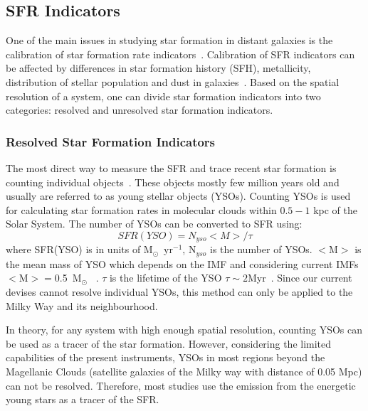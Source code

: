 \subsection{SFR Indicators}

One of the main issues in studying star formation in distant galaxies is the calibration of star formation rate indicators~\citep[e.g.,][]{Lee10}. 
Calibration of SFR indicators can be affected by differences in star formation history (SFH), metallicity, distribution of stellar population and dust in galaxies~\citep{Calzetti13}. 
Based on the spatial resolution of a system, one can divide star formation indicators into two categories: resolved and unresolved star formation indicators.

\subsubsection{Resolved Star Formation Indicators}
The most direct way to measure the SFR and trace recent star formation is counting individual objects~\citep{Kennicutt12}. 
These objects mostly few million years old and usually are referred to as young stellar objects (YSOs). 
Counting YSOs is used for calculating star formation rates in molecular clouds within $0.5- 1$ kpc of the Solar System. 
The number of YSOs can be converted to SFR using: 
\begin{equation}
SFR(YSO) = N_{yso} <M>/\tau 
\end{equation}
where SFR(YSO) is in units of M$_{\odot}$~yr$^{-1}$, N$_{yso}$ is the number of YSOs.
$<$M$>$ is the mean mass of YSO which depends on the IMF and considering current IMFs $<$M$> = $0.5~M$_{\odot}$ ~\citep[][]{Kennicutt12}. 
$\tau$ is the lifetime of the YSO  $\tau \sim 2$Myr~\citep{Evans09}. 
Since our current devises cannot resolve individual YSOs, this method can only be applied to the Milky Way and its neighbourhood. 

In theory, for any system with high enough spatial resolution, counting YSOs can be used as a tracer of the star formation. 
However, considering the limited capabilities of the present instruments, YSOs in most regions beyond the Magellanic Clouds (satellite galaxies of the Milky way with distance of 0.05 Mpc) can not be resolved. 
Therefore, most studies use the emission from the energetic young stars as a tracer of the SFR. 
